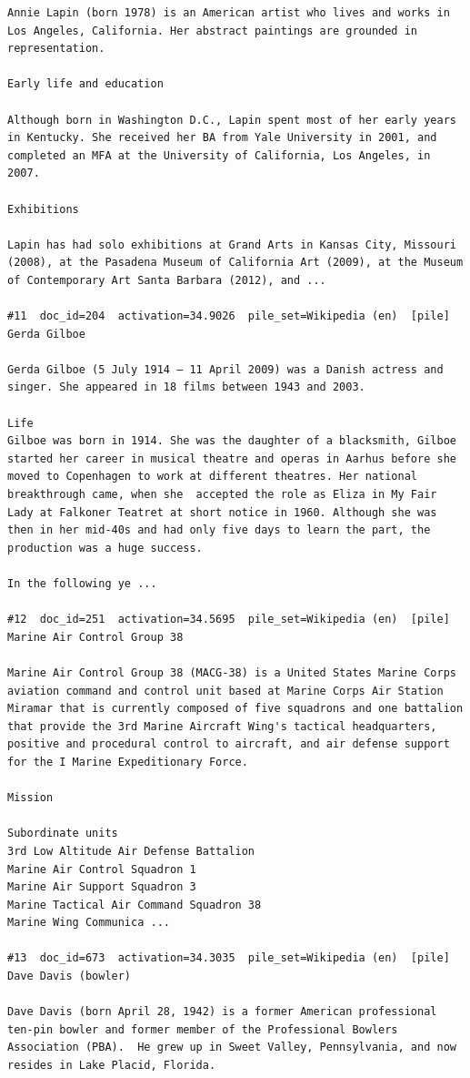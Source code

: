 \begin{verbatim}
Annie Lapin (born 1978) is an American artist who lives and works in Los Angeles, California. Her abstract paintings are grounded in representation.

Early life and education 

Although born in Washington D.C., Lapin spent most of her early years in Kentucky. She received her BA from Yale University in 2001, and completed an MFA at the University of California, Los Angeles, in 2007.

Exhibitions 

Lapin has had solo exhibitions at Grand Arts in Kansas City, Missouri (2008), at the Pasadena Museum of California Art (2009), at the Museum of Contemporary Art Santa Barbara (2012), and ...

#11  doc_id=204  activation=34.9026  pile_set=Wikipedia (en)  [pile]
Gerda Gilboe

Gerda Gilboe (5 July 1914 – 11 April 2009) was a Danish actress and singer. She appeared in 18 films between 1943 and 2003.

Life 
Gilboe was born in 1914. She was the daughter of a blacksmith, Gilboe started her career in musical theatre and operas in Aarhus before she moved to Copenhagen to work at different theatres. Her national breakthrough came, when she  accepted the role as Eliza in My Fair Lady at Falkoner Teatret at short notice in 1960. Although she was then in her mid-40s and had only five days to learn the part, the production was a huge success.

In the following ye ...

#12  doc_id=251  activation=34.5695  pile_set=Wikipedia (en)  [pile]
Marine Air Control Group 38

Marine Air Control Group 38 (MACG-38) is a United States Marine Corps aviation command and control unit based at Marine Corps Air Station Miramar that is currently composed of five squadrons and one battalion that provide the 3rd Marine Aircraft Wing's tactical headquarters, positive and procedural control to aircraft, and air defense support for the I Marine Expeditionary Force.

Mission

Subordinate units
3rd Low Altitude Air Defense Battalion
Marine Air Control Squadron 1
Marine Air Support Squadron 3
Marine Tactical Air Command Squadron 38
Marine Wing Communica ...

#13  doc_id=673  activation=34.3035  pile_set=Wikipedia (en)  [pile]
Dave Davis (bowler)

Dave Davis (born April 28, 1942) is a former American professional ten-pin bowler and former member of the Professional Bowlers Association (PBA).  He grew up in Sweet Valley, Pennsylvania, and now resides in Lake Placid, Florida.


\end{verbatim}
